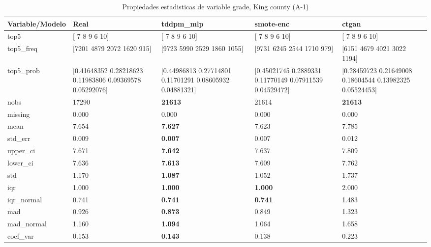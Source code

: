 \begin{table}[H]
\centering
\fontsize{8}{14}\selectfont
\caption{Propiedades  estadisticas de variable grade, King county (A-1)}
\label{table-stats-king county-a-1-grade}
\begin{tabular}{|l|m{10em}|m{10em}|m{10em}|m{10em}|}
\hline
 \rowcolor[gray]{0.8}
Variable/Modelo & Real & tddpm\_mlp & smote-enc & ctgan \\
\hline top5 & [ 7  8  9  6 10] & [ 7  8  9  6 10] & [ 7  8  9  6 10] & [ 7  8  9  6 10] \\
\hline top5\_freq & [7201 4879 2072 1620  915] & [9723 5990 2529 1860 1055] & [9731 6245 2544 1710  979] & [6151 4679 4021 3022 1194] \\
\hline top5\_prob & [0.41648352 0.28218623 0.11983806 0.09369578 0.05292076] & [0.44986813 0.27714801 0.11701291 0.08605932 0.04881321] & [0.45021745 0.2889331  0.11770149 0.07911539 0.04529472] & [0.28459723 0.21649008 0.18604544 0.13982325 0.05524453] \\
\hline nobs & 17290 & \bfseries 21613 & \cellcolor[rgb]{0.9, 0.54, 0.52} 21614 & \bfseries 21613 \\
\hline missing & 0.000 & 0.000 & 0.000 & 0.000 \\
\hline mean & 7.654 & \bfseries 7.627 & 7.623 & \cellcolor[rgb]{0.9, 0.54, 0.52} 7.785 \\
\hline std\_err & 0.009 & \bfseries 0.007 & 0.007 & \cellcolor[rgb]{0.9, 0.54, 0.52} 0.012 \\
\hline upper\_ci & 7.671 & \bfseries 7.642 & 7.637 & \cellcolor[rgb]{0.9, 0.54, 0.52} 7.809 \\
\hline lower\_ci & 7.636 & \bfseries 7.613 & 7.609 & \cellcolor[rgb]{0.9, 0.54, 0.52} 7.762 \\
\hline std & 1.170 & \bfseries 1.087 & 1.052 & \cellcolor[rgb]{0.9, 0.54, 0.52} 1.737 \\
\hline iqr & 1.000 & \bfseries 1.000 & \bfseries 1.000 & \cellcolor[rgb]{0.9, 0.54, 0.52} 2.000 \\
\hline iqr\_normal & 0.741 & \bfseries 0.741 & \bfseries 0.741 & \cellcolor[rgb]{0.9, 0.54, 0.52} 1.483 \\
\hline mad & 0.926 & \bfseries 0.873 & 0.849 & \cellcolor[rgb]{0.9, 0.54, 0.52} 1.323 \\
\hline mad\_normal & 1.160 & \bfseries 1.094 & 1.064 & \cellcolor[rgb]{0.9, 0.54, 0.52} 1.658 \\
\hline coef\_var & 0.153 & \bfseries 0.143 & 0.138 & \cellcolor[rgb]{0.9, 0.54, 0.52} 0.223 \\

\end{tabular}
\end{table}
